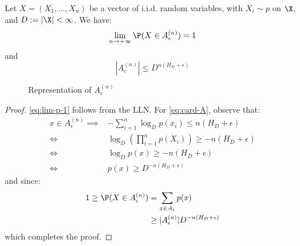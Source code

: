 \documentclass[toc]{../cs-classes/cs-classes}
\begin{document}
\begin{property}
    \label{prop:typ-seq-concentrate}
    Let $X=(X_1, \dots, X_n)$ be a vector of i.i.d. random variables, with $X_i\sim p$ on $\X$, and $D:=|\X|<\infty$. We have:
    \begin{equation}
        \label{eq:lim-p-1}
        \lim_{n\to+\infty}\P(X\in A_\epsilon^{(n)})=1
    \end{equation}
    and
    \begin{equation}
        \label{eq:card-A}
        |A_\epsilon^{(n)}|\leq D^{n(H_D+\epsilon)}
    \end{equation}
    \begin{figure}
        \center
        \caption{Representation of $A_\epsilon^{(n)}$}
    \end{figure}
\end{property}

\begin{proof}
    \eqref{eq:lim-p-1} follows from the LLN. For \eqref{eq:card-A}, observe that:
    \begin{equation*}
        \begin{aligned}
            x\in A_\epsilon^{(n)}\implies& -\sum_{i=1}^n \log_D p(x_i)\leq n(H_D+\epsilon)\\
            \iff&\log_D\left(\prod_{i=1}^n p(X_i)\right)\geq -n(H_D+\epsilon)\\
            \iff&\log_Dp(x)\geq -n(H_D+\epsilon)\\
            \iff&p(x)\geq D^{-n(H_D+\epsilon)}
        \end{aligned}
    \end{equation*}
    and since:
    \begin{equation*}
        \begin{aligned}
            1\geq \P(X\in A_\epsilon^{(n)})&=\sum_{x\in A_\epsilon}p(x)\\
            &\geq |A_\epsilon^{(n)}|D^{-n(H_D+\epsilon)}
        \end{aligned}
    \end{equation*}
    which completes the proof.
\end{proof}
\end{document}
